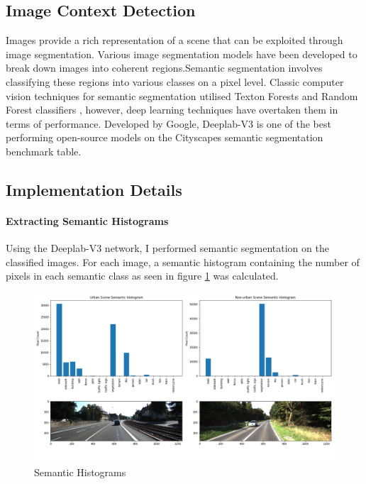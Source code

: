 \subsection{Image Context Detection}

Images provide a rich representation of a scene that can be exploited through image segmentation. Various image segmentation models have been developed to break down images into coherent regions.Semantic segmentation involves classifying these regions into various classes on a pixel level. 
Classic computer vision techniques for semantic segmentation utilised Texton Forests\cite{shotton2008semantic} and Random Forest classifiers \cite{shotton2011real}, however, deep learning techniques have overtaken them in terms of performance. 
Developed by Google,  Deeplab-V3 is one of the best performing open-source models on the Cityscapes semantic segmentation benchmark table. 

\subsection*{Implementation Details}


\paragraph{Extracting Semantic Histograms} Using the Deeplab-V3 network, I performed semantic segmentation on the classified images. For each image, a semantic histogram containing the number of pixels in each semantic class as seen in figure \ref{fig:sem_hist} was calculated. 


\begin{figure}[h]%
	\centering
	\includegraphics[width=\linewidth]{images/semantic_hist.png}%
	\caption{Semantic Histograms}%
	\label{fig:sem_hist}%
\end{figure} 

